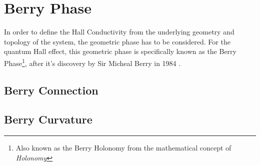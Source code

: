\section{Berry Phase}
In order to define the Hall Conductivity from the underlying geometry and topology of the system, the geometric phase has to be considered. For the quantum Hall effect, this geometric phase is specifically known as the Berry Phase\footnote{Also known as the Berry Holonomy from the mathematical concept of \textit{Holonomy}}, after it's discovery by Sir Micheal Berry in 1984 \cite{quantal_phase}. 




\cite{phase-adia}
\subsection{Berry Connection}
\subsection{Berry Curvature}
